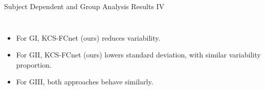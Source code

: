 \documentclass[aspectratio=169]{beamer}
\begin{document}
\begin{frame}{Subject Dependent and Group Analysis Results IV}
    \begin{columns}
            \centering
            \resizebox{1\linewidth}{!}{}
        \begin{itemize}
            \item For GI, KCS-FCnet (ours) reduces variability.
            \item For GII, KCS-FCnet (ours) lowers standard deviation, with similar variability proportion.
            \item For GIII, both approaches behave similarly.
        \end{itemize}
    \end{columns}
\end{frame}
\end{document}
